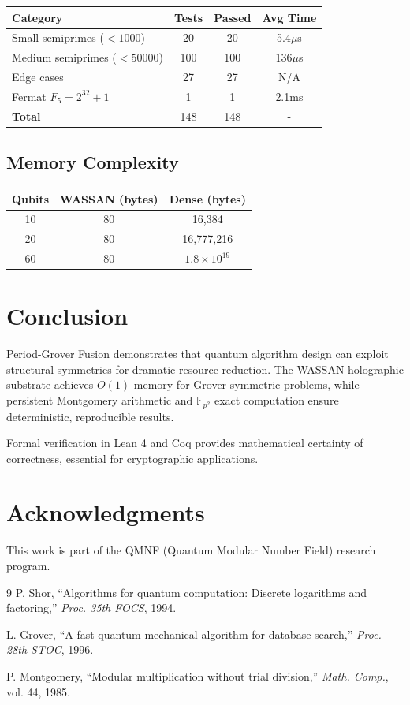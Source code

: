 \documentclass[11pt,a4paper]{article}
\begin{document}
\begin{center}
\begin{tabular}{|l|c|c|c|}
\hline
\textbf{Category} & \textbf{Tests} & \textbf{Passed} & \textbf{Avg Time} \\
\hline
Small semiprimes ($< 1000$) & 20 & 20 & 5.4$\mu$s \\
Medium semiprimes ($< 50000$) & 100 & 100 & 136$\mu$s \\
Edge cases & 27 & 27 & N/A \\
Fermat $F_5 = 2^{32}+1$ & 1 & 1 & 2.1ms \\
\hline
\textbf{Total} & 148 & 148 & - \\
\hline
\end{tabular}
\end{center}

\subsection{Memory Complexity}

\begin{center}
\begin{tabular}{|c|c|c|}
\hline
\textbf{Qubits} & \textbf{WASSAN (bytes)} & \textbf{Dense (bytes)} \\
\hline
10 & 80 & 16,384 \\
20 & 80 & 16,777,216 \\
60 & 80 & $1.8 \times 10^{19}$ \\
\hline
\end{tabular}
\end{center}

\section{Conclusion}

Period-Grover Fusion demonstrates that quantum algorithm design can exploit structural symmetries for dramatic resource reduction. The WASSAN holographic substrate achieves $O(1)$ memory for Grover-symmetric problems, while persistent Montgomery arithmetic and $\mathbb{F}_{p^2}$ exact computation ensure deterministic, reproducible results.

Formal verification in Lean 4 and Coq provides mathematical certainty of correctness, essential for cryptographic applications.

\section*{Acknowledgments}

This work is part of the QMNF (Quantum Modular Number Field) research program.

\begin{thebibliography}{9}
P. Shor, ``Algorithms for quantum computation: Discrete logarithms and factoring,'' \textit{Proc. 35th FOCS}, 1994.

L. Grover, ``A fast quantum mechanical algorithm for database search,'' \textit{Proc. 28th STOC}, 1996.

P. Montgomery, ``Modular multiplication without trial division,'' \textit{Math. Comp.}, vol. 44, 1985.
\end{thebibliography}
\end{document}
